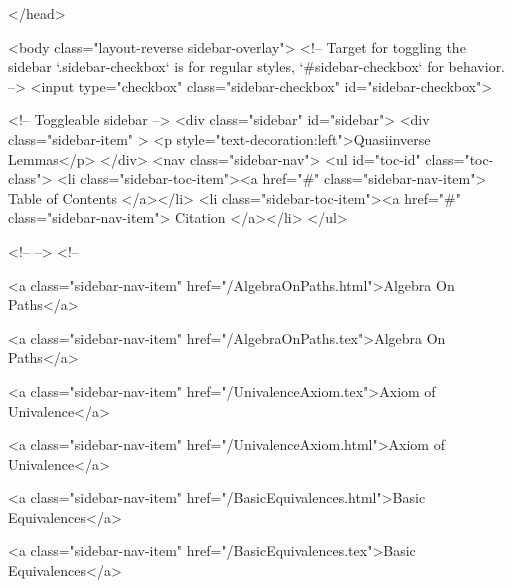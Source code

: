   
</head>




  <body class="layout-reverse sidebar-overlay">
    <!-- Target for toggling the sidebar `.sidebar-checkbox` is for regular
     styles, `#sidebar-checkbox` for behavior. -->
<input type="checkbox" class="sidebar-checkbox" id="sidebar-checkbox">

<!-- Toggleable sidebar -->
<div class="sidebar" id="sidebar">
  <div class="sidebar-item" >
    <p style="text-decoration:left">Quasiinverse Lemmas</p>
  </div>
  <nav class="sidebar-nav">
    <ul id="toc-id" class="toc-class">
  <li class="sidebar-toc-item"><a href="#" class="sidebar-nav-item"> Table of Contents </a></li>
  <li class="sidebar-toc-item"><a href="#" class="sidebar-nav-item"> Citation </a></li>
</ul>


    <!--  -->
    <!-- 
      
    
      
    
      
    
      
    
      
        
      
    
      
        
          <a class="sidebar-nav-item" href="/AlgebraOnPaths.html">Algebra On Paths</a>
        
      
    
      
        
          <a class="sidebar-nav-item" href="/AlgebraOnPaths.tex">Algebra On Paths</a>
        
      
    
      
        
          <a class="sidebar-nav-item" href="/UnivalenceAxiom.tex">Axiom of Univalence</a>
        
      
    
      
        
          <a class="sidebar-nav-item" href="/UnivalenceAxiom.html">Axiom of Univalence</a>
        
      
    
      
        
          <a class="sidebar-nav-item" href="/BasicEquivalences.html">Basic Equivalences</a>
        
      
    
      
        
          <a class="sidebar-nav-item" href="/BasicEquivalences.tex">Basic Equivalences</a>
        
